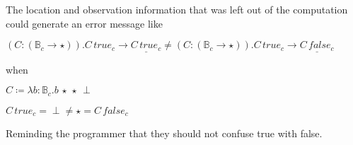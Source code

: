 The location and observation information that was left out of the computation could generate an error message like

$\left(C:\left(\mathbb{B}_{c}\rightarrow\star\right)\right).C\,true_{c}\rightarrow\underline{C\,true_{c}}\neq\left(C:\left(\mathbb{B}_{c}\rightarrow\star\right)\right).C\,true_{c}\rightarrow\underline{C\,false_{c}}$

when 

$C\coloneqq\lambda b:\mathbb{B}_{c}.b\,\star\,\star\,\perp$

$C\,true_{c}=\perp\neq\star=C\,false_{c}$

Reminding the programmer that they should not confuse true with false.